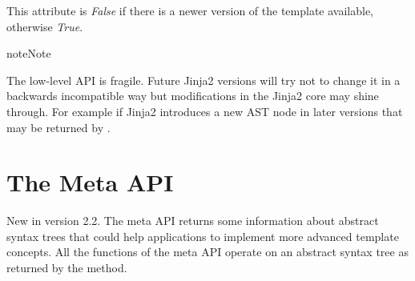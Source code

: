 \documentclass[a4paper,10pt,english]{sphinxmanual}
\begin{document}

\begin{fulllineitems}
\label{api:jinja2.Template.is_up_to_date}
This attribute is \emph{False} if there is a newer version of the template
available, otherwise \emph{True}.

\end{fulllineitems}


\begin{notice}{note}{Note}

The low-level API is fragile.  Future Jinja2 versions will try not to
change it in a backwards incompatible way but modifications in the Jinja2
core may shine through.  For example if Jinja2 introduces a new AST node
in later versions that may be returned by {\hyperref[api:jinja2.Environment.parse]{}}.
\end{notice}


\section{The Meta API}
\label{api:the-meta-api}New in version 2.2.
The meta API returns some information about abstract syntax trees that
could help applications to implement more advanced template concepts.  All
the functions of the meta API operate on an abstract syntax tree as
returned by the {\hyperref[api:jinja2.Environment.parse]{}} method.
\end{document}
